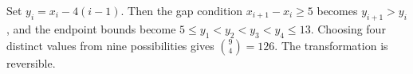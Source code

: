 Set $y_i=x_i-4(i-1)$. Then the gap condition $x_{i+1}-x_i\ge5$ becomes $y_{i+1}>y_i$, and the endpoint bounds become $5\le y_1<y_2<y_3<y_4\le13$. Choosing four distinct values from nine possibilities gives $\binom94=\boxed{126}$. The transformation is reversible.
